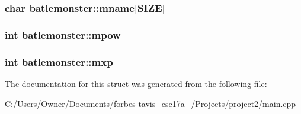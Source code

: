 \subsubsection[{mname}]{\setlength{\rightskip}{0pt plus 5cm}char batlemonster\+::mname\mbox{[}{\bf S\+I\+Z\+E}\mbox{]}}\label{structbatlemonster_a6c57d5d01f9158a2a9ccefc8b415e9c0}
\hypertarget{structbatlemonster_ad31fa7808b66b010420cd5f1a8e3a5a5}{}
\subsubsection[{mpow}]{\setlength{\rightskip}{0pt plus 5cm}int batlemonster\+::mpow}\label{structbatlemonster_ad31fa7808b66b010420cd5f1a8e3a5a5}
\hypertarget{structbatlemonster_a1bb930b1c95ac77044b9ce1cfa456bf6}{}
\subsubsection[{mxp}]{\setlength{\rightskip}{0pt plus 5cm}int batlemonster\+::mxp}\label{structbatlemonster_a1bb930b1c95ac77044b9ce1cfa456bf6}


The documentation for this struct was generated from the following file\+:\begin{DoxyCompactItemize}
\item 
C\+:/\+Users/\+Owner/\+Documents/forbes-\/tavis\+\_\+csc17a\+\_/\+Projects/project2/\hyperlink{main_8cpp}{main.\+cpp}\end{DoxyCompactItemize}
